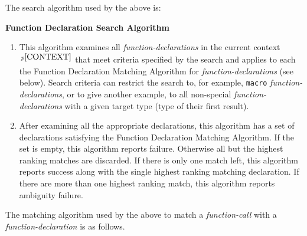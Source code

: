 \documentclass[12pt]{article}
\newcommand{\pagnote}[1]{$\,^{p\pageref{#1}}$}
\begin{document}
\bigskip

The search algorithm used by the above is:

\bigskip

\centerline{\bf Function Declaration Search Algorithm}
\begin{enumerate}
\item This algorithm examines all {\em function-declarations}
in the current context\pagnote{CONTEXT} that meet criteria specified by the
search and applies to each the
Function Declaration Matching Algorithm for
{\em function-declarations} (see below).
Search criteria can restrict the search to, for example, {\tt macro}
{\em function-declarations}, or to give another example,
to all non-special {\em function-declarations} with a given target type
(type of their first result).
\item
After examining all the appropriate declarations, this algorithm has
a set of declarations satisfying the
Function Declaration Matching Algorithm.
If the set is empty, this algorithm reports failure.  Otherwise all but
the highest ranking matches are discarded.  If there is only one match
left, this algorithm reports success along with the single highest
ranking matching declaration.
If there are more than one highest ranking match, this algorithm reports
ambiguity failure.

\end{enumerate}

The matching algorithm used by the above to match a {\em function-call}
with a {\em function-declara\-tion} is as follows.

\bigskip
\end{document}
